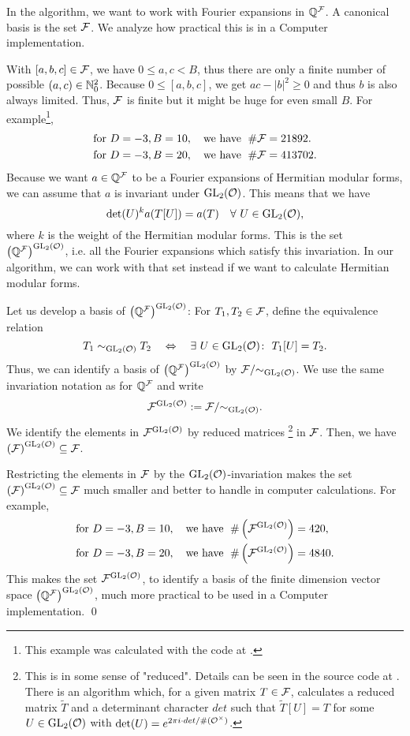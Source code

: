 \begin{remark}
\label{remark:reducedCurlF}
In the algorithm, we want to work with Fourier expansions in $\mathbb{Q}^{\mathcal{F}}$. A canonical basis is the set $\mathcal{F}$. We analyze how practical this is in a Computer implementation.

With $[a,b,c] \in \mathcal{F}$, we have $0\le a,c<B$, thus there are only a finite number of possible $(a,c) \in \mathbb{N}_0^2$. Because $0 \le [a,b,c]$, we get $ac - \left| b \right|^2 \ge 0$ and thus $b$ is also always limited. Thus, $\mathcal{F}$ is finite but it might be huge for even small $B$.
For example\footnote{This example was calculated with the code at \cite{Zeyer13Github}.},
\begin{align*}
& \text{for } D=-3, B=10,\quad \text{we have } \; \# \mathcal{F} = 21892. \\
& \text{for } D=-3, B=20,\quad \text{we have } \; \# \mathcal{F} = 413702.
\end{align*}
%
Because we want $a \in \mathbb{Q}^{\mathcal{F}}$ to be a Fourier expansions of Hermitian modular forms, we can assume that $a$ is invariant under $\operatorname{GL}_2(\mathcal{O})$. This means that we have
\[ \det(U)^k a(T[U]) = a(T) \quad \forall\ U \in \operatorname{GL}_2(\mathcal{O}) , \]
where $k$ is the weight of the Hermitian modular forms.
This is the set ${\left(\mathbb{Q}^{\mathcal{F}}\right)}^{\operatorname{GL}_2(\mathcal{O})}$, i.e. all the Fourier expansions which satisfy this invariation. In our algorithm, we can work with that set instead if we want to calculate Hermitian modular forms.

Let us develop a basis of ${\left(\mathbb{Q}^{\mathcal{F}}\right)}^{\operatorname{GL}_2(\mathcal{O})}$: For $T_1, T_2 \in \mathcal{F}$, define the equivalence relation
\[ T_1 \sim_{\operatorname{GL}_2(\mathcal{O})} T_2 \quad \Leftrightarrow \quad \exists\ U \in \operatorname{GL}_2(\mathcal{O}) \colon\ T_1[U] = T_2. \]
Thus, we can identify a basis of ${\left(\mathbb{Q}^{\mathcal{F}}\right)}^{\operatorname{GL}_2(\mathcal{O})}$ by $\mathcal{F} / { \sim_{\operatorname{GL}_2(\mathcal{O})} }$.
We use the same invariation notation as for $\mathbb{Q}^{\mathcal{F}}$ and write
\[ {\mathcal{F}}^{\operatorname{GL}_2(\mathcal{O})} := \mathcal{F} / { \sim_{\operatorname{GL}_2(\mathcal{O})} } . \]
We identify the elements in ${\mathcal{F}}^{\operatorname{GL}_2(\mathcal{O})}$ by reduced matrices%
\footnote{%
This is in some sense of "reduced". Details can be seen in the source code at \cite{Zeyer13Github}. There is an algorithm which, for a given matrix $T \in \mathcal{F}$, calculates a reduced matrix $\tilde{T}$ and a determinant character $det$ such that $\tilde{T}[U] = T$ for some $U \in \operatorname{GL}_2(\mathcal{O})$ with $\det(U) = e^{2 \pi i \cdot det / {\#(\mathcal{O}^\times)}}$.
}
in $\mathcal{F}$. Then, we have ${\left(\mathcal{F}\right)}^{\operatorname{GL}_2(\mathcal{O})} \subseteq \mathcal{F}$.

Restricting the elements in $\mathcal{F}$ by the $\operatorname{GL}_2(\mathcal{O})$-invariation makes the set ${\left(\mathcal{F}\right)}^{\operatorname{GL}_2(\mathcal{O})} \subseteq \mathcal{F}$ much smaller and better to handle in computer calculations.
For example,
\begin{align*}
& \text{for } D=-3, B=10,\quad \text{we have } \; \# \left({\mathcal{F}}^{\operatorname{GL}_2(\mathcal{O})}\right) = 420, \\
& \text{for } D=-3, B=20,\quad \text{we have } \; \# \left({\mathcal{F}}^{\operatorname{GL}_2(\mathcal{O})}\right) = 4840.
\end{align*}
%
This makes the set ${\mathcal{F}}^{\operatorname{GL}_2(\mathcal{O})}$, to identify a basis of the finite dimension vector space ${\left(\mathbb{Q}^{\mathcal{F}}\right)}^{\operatorname{GL}_2(\mathcal{O})}$, much more practical to be used in a Computer implementation.
\qed
\end{remark}

